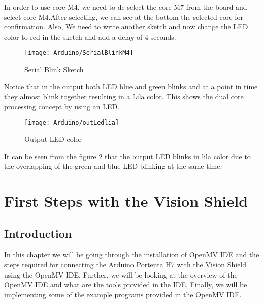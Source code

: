 In order to use core M4, we need to de-select the core M7 from the board and select core M4.After selecting, we can see at the bottom the selected core for confirmation. Also, We need to write another sketch and  now change the LED color to red in the sketch and add a delay of 4 seconds. 
\begin{figure}[H]
	\centering
	\texttt{[image: Arduino/SerialBlinkM4]}
	\caption{Serial Blink Sketch}
	\label{figure 5.6}
\end{figure}

Notice that in the output both LED blue and green blinks and at a point in time they almost blink together resulting in a Lila color. This shows the dual core processing concept by using an LED.

\begin{figure}[H]
	\centering
	\texttt{[image: Arduino/outLedlia]}
	\caption{Output LED color}
	\label{figure 5.7}
\end{figure}
It can be seen from the figure \ref{figure 5.7} that the output LED blinks in lila color due to the overlapping of the green and blue LED blinking at the same time.
\chapter{First Steps with the Vision Shield}
\section{Introduction}
In this chapter we will be going through the installation of OpenMV IDE and the steps required for connecting the Arduino Portenta H7 with the Vision Shield using the OpenMV IDE. Further, we will be looking at the overview of the OpenMV IDE and what are the tools provided in the IDE.  Finally, we will be implementing some of the example programs provided in the OpenMV IDE.
